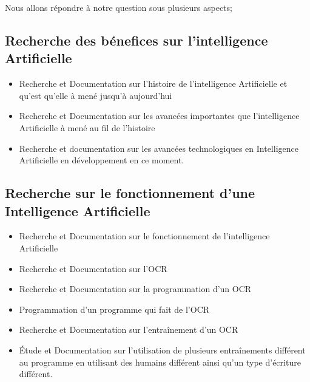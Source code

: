 Nous allons répondre à notre question sous plusieurs aspects;

\subsection{Recherche des bénefices sur l'intelligence Artificielle}
\begin{itemize}
    \item Recherche et Documentation sur l'histoire de l'intelligence Artificielle 
et qu'est qu'elle à mené jusqu'à aujourd'hui
      
    \item Recherche et Documentation sur les avancées importantes que 
l'intelligence Artificielle à mené au fil de l'histoire
     
    \item Recherche et documentation sur les avancées technologiques en 
Intelligence Artificielle en développement en ce moment.
\end{itemize}
      
\subsection{Recherche sur le fonctionnement d'une Intelligence Artificielle}

\begin{itemize}

    \item Recherche et Documentation sur le fonctionnement de l'intelligence Artificielle
    
    \item Recherche et Documentation sur l'OCR
    
    \item Recherche et Documentation sur la programmation d'un OCR
    
    \item Programmation d'un programme qui fait de l'OCR
    
    \item Recherche et Documentation sur l'entraînement d'un OCR
    
    \item Étude et Documentation sur l'utilisation de plusieurs entraînements différent au programme en utilisant des humains différent ainsi qu'un type d'écriture différent.
    
\end{itemize}
      
    

